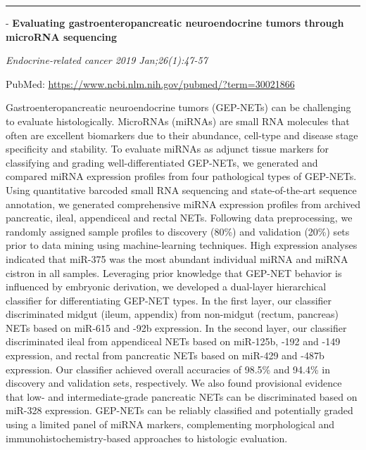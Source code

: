 \documentclass[]{article}
\begin{document}
{}

{}

\begin{center}\rule{0.5\linewidth}{\linethickness}\end{center}

 - \textbf{Evaluating gastroenteropancreatic neuroendocrine tumors
through microRNA sequencing}

\emph{Endocrine-related cancer 2019 Jan;26(1):47-57}

PubMed: \url{https://www.ncbi.nlm.nih.gov/pubmed/?term=30021866}

Gastroenteropancreatic neuroendocrine tumors (GEP-NETs) can be
challenging to evaluate histologically. MicroRNAs (miRNAs) are small RNA
molecules that often are excellent biomarkers due to their abundance,
cell-type and disease stage specificity and stability. To evaluate
miRNAs as adjunct tissue markers for classifying and grading
well-differentiated GEP-NETs, we generated and compared miRNA expression
profiles from four pathological types of GEP-NETs. Using quantitative
barcoded small RNA sequencing and state-of-the-art sequence annotation,
we generated comprehensive miRNA expression profiles from archived
pancreatic, ileal, appendiceal and rectal NETs. Following data
preprocessing, we randomly assigned sample profiles to discovery (80\%)
and validation (20\%) sets prior to data mining using machine-learning
techniques. High expression analyses indicated that miR-375 was the most
abundant individual miRNA and miRNA cistron in all samples. Leveraging
prior knowledge that GEP-NET behavior is influenced by embryonic
derivation, we developed a dual-layer hierarchical classifier for
differentiating GEP-NET types. In the first layer, our classifier
discriminated midgut (ileum, appendix) from non-midgut (rectum,
pancreas) NETs based on miR-615 and -92b expression. In the second
layer, our classifier discriminated ileal from appendiceal NETs based on
miR-125b, -192 and -149 expression, and rectal from pancreatic NETs
based on miR-429 and -487b expression. Our classifier achieved overall
accuracies of 98.5\% and 94.4\% in discovery and validation sets,
respectively. We also found provisional evidence that low- and
intermediate-grade pancreatic NETs can be discriminated based on miR-328
expression. GEP-NETs can be reliably classified and potentially graded
using a limited panel of miRNA markers, complementing morphological and
immunohistochemistry-based approaches to histologic evaluation.

{}
\end{document}
